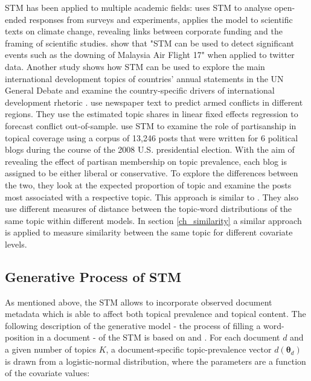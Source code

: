 \documentclass[12pt,a4paper,notitlepage]{article}
\begin{document}
STM has been applied to multiple academic fields: \citet{roberts_structural_2014} uses STM to analyse open-ended responses from surveys and experiments, \citet{farrell_corporate_2016} applies the model to scientific texts on climate change, revealing links between corporate funding and the framing of scientific studies. \citet{mishler_using_2015} show that "STM can be used to detect significant events such as the downing of Malaysia Air Flight 17" when applied to twitter data. Another study shows how STM can be used to explore the main international development topics of countries’ annual statements in the UN General Debate and examine the country-specific drivers of international development rhetoric \citep{baturo_what_2017}. \citet{mueller_reading_2016} use newspaper text to predict armed conflicts in different regions. They use the estimated topic shares in linear fixed effects regression to forecast conflict out-of-sample. \citet{roberts_navigating_2016} use STM to examine the role of partisanship in topical coverage using a corpus of 13,246 posts that were written for 6 political blogs during the course of the 2008 U.S. presidential election. With the aim of revealing the effect of partisan membership on topic prevalence, each blog is assigned to be either liberal or conservative. To explore the differences between the two, they look at the expected proportion of topic and examine the posts most associated with a respective topic. This approach is similar to \citet{roberts_model_2016}. They also use different measures of distance between the topic-word distributions of the same topic within different models. In section \ref{ch_similarity} a similar approach is applied to measure similarity between the same topic for different covariate levels.

\subsection{Generative Process of STM}\label{ch_generativeProcess}

As mentioned above, the STM allows to incorporate observed document metadata which is able to affect both topical prevalence and topical content. The following description of the generative model - the process of filling a word-position in a document - of the STM is based on \citet{roberts_structural_2013} and \citet{roberts_stm:_2016}. For each document $d$ and a given number of topics $K$, a document-specific topic-prevalence vector $d(\boldsymbol{\theta}_d)$ is drawn from a logistic-normal distribution, where the parameters are a function of the covariate values:
\end{document}
